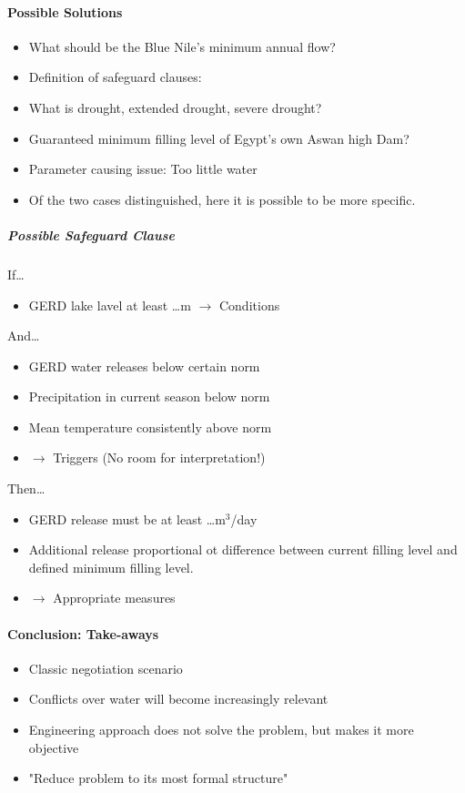 \paragraph{Possible Solutions}

\begin{itemize}
    \item What should be the Blue Nile's minimum annual flow?
    \item Definition of safeguard clauses:
        \item What is drought, extended drought, severe drought?
        \item Guaranteed minimum filling level of Egypt's own Aswan high Dam?
        \item Parameter causing issue: Too little water
        \item Of the two cases distinguished, here it is possible to be more specific.
\end{itemize}

\subparagraph{Possible Safeguard Clause}

If\dots
\begin{itemize}
    \item GERD lake lavel at least \dots m $\rightarrow$ Conditions
\end{itemize}
And\dots
\begin{itemize}
    \item GERD water releases below certain norm
    \item Precipitation in current season below norm
    \item Mean temperature consistently above norm
    \item $\rightarrow$ Triggers (No room for interpretation!)
\end{itemize}
Then\dots
\begin{itemize}
    \item GERD release must be at least \dots m$^3$/day
    \item Additional release proportional ot difference between current
        filling level and defined minimum filling level.
    \item $\rightarrow$ Appropriate measures
\end{itemize}

\paragraph{Conclusion: Take-aways}

\begin{itemize}
    \item Classic negotiation scenario
    \item Conflicts over water will become increasingly relevant
    \item Engineering approach does not solve the problem, but makes it more objective
    \item "Reduce problem to its most formal structure"
\end{itemize}


